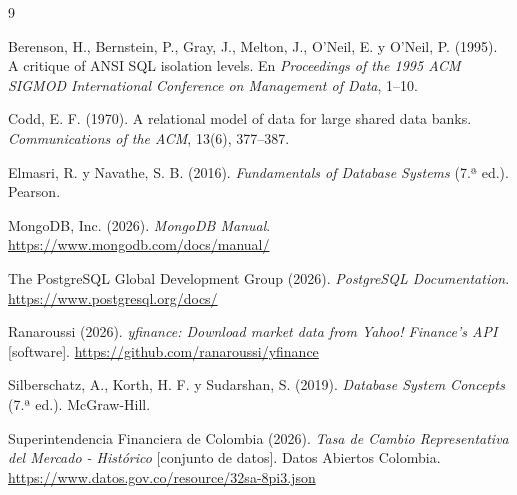 \documentclass[10pt,letterpaper]{article}
\renewcommand{\_}{\oldUS\allowbreak}
\begin{document}
\begin{thebibliography}{9}
\small
\setlength{\itemsep}{2pt}

Berenson, H., Bernstein, P., Gray, J., Melton, J., O'Neil, E. y O'Neil, P. (1995). A critique of ANSI SQL isolation levels. En \textit{Proceedings of the 1995 ACM SIGMOD International Conference on Management of Data}, 1--10.

Codd, E. F. (1970). A relational model of data for large shared data banks. \textit{Communications of the ACM}, 13(6), 377--387.

Elmasri, R. y Navathe, S. B. (2016). \textit{Fundamentals of Database Systems} (7.ª ed.). Pearson.

MongoDB, Inc. (2026). \textit{MongoDB Manual}. \url{https://www.mongodb.com/docs/manual/}

The PostgreSQL Global Development Group (2026). \textit{PostgreSQL Documentation}. \url{https://www.postgresql.org/docs/}

Ranaroussi (2026). \textit{yfinance: Download market data from Yahoo! Finance's API} [software]. \url{https://github.com/ranaroussi/yfinance}

Silberschatz, A., Korth, H. F. y Sudarshan, S. (2019). \textit{Database System Concepts} (7.ª ed.). McGraw-Hill.

Superintendencia Financiera de Colombia (2026). \textit{Tasa de Cambio Representativa del Mercado - Histórico} [conjunto de datos]. Datos Abiertos Colombia. \url{https://www.datos.gov.co/resource/32sa-8pi3.json}

\end{thebibliography}
\end{document}
